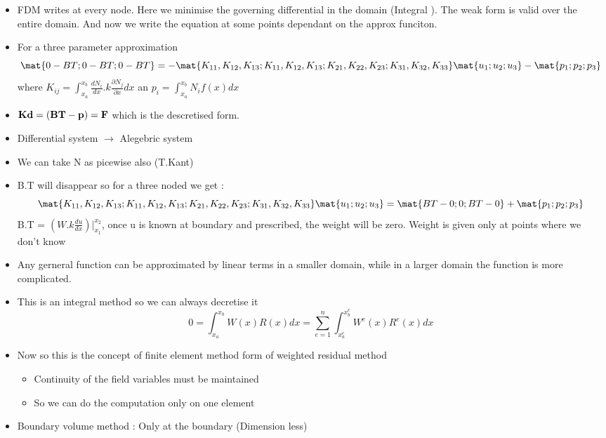 	\begin{frame}
		\begin{itemize}
			\item FDM writes at every node. Here we minimise the governing differential in the domain (Integral ). The weak form is valid over the entire domain. And now we write the equation at some points dependant on the approx funciton.
			\item For a three parameter approximation
			\begin{equation}
			\mat{0-BT;0-BT;0-BT} = -\mat{K_{11},K_{12},K_{13}; K_{11},K_{12},K_{13};K_{21},K_{22},K_{23}; K_{31},K_{32},K_{33} }\mat{u_1;u_2;u_3} - \mat{p_1;p_2;p_3}
			\end{equation}
			where $K_{ij} = \int_{x_a}^{x_b} \frac{dN_i}{dx}.k \frac{\partial N_j }{\partial x} dx$ an $p_i = \int_{x_a}^{x_b} N_if(x)dx$
			\item $\mathbf{Kd = (BT-p) = F}$ which is the descretised form. 
			\item Differential system $\rightarrow$ Alegebric system
			\item We can take N as picewise also (T.Kant)
			\item B.T will disappear so for a three noded we get :
				\begin{equation}
			\mat{K_{11},K_{12},K_{13}; K_{11},K_{12},K_{13};K_{21},K_{22},K_{23}; K_{31},K_{32},K_{33} }\mat{u_1;u_2;u_3} =\mat{BT-0;0;BT-0} + \mat{p_1;p_2;p_3} 
			\end{equation}	
			B.T = $(W.k\frac{d u}{dx})|^{x_2}_{x_1}$, once u is known at boundary and prescribed, the weight will be zero. Weight is given only at points where we don't know
	\end{itemize}
	\end{frame}



	\begin{frame}
		\begin{itemize}
			\item Any  gerneral function can be approximated by linear terms in a smaller domain, while in a larger domain the function is more complicated.
			\item This is an integral method so we can always decretise it
			\begin{equation}
			0=\int_{x_a}^{x_b} W(x)R(x)dx = \sum_{e=1}^{n} \int_{x_a^e}^{x_b^e} W^e(x)R^e(x)dx
			\end{equation}
			\item Now so this is the concept of finite element method form of weighted residual method
			\begin{itemize}
				\item Continuity of the field variables must be maintained
				\item So we can do the computation only on one element
				
			\end{itemize}
			\item Boundary volume method : Only at the boundary (Dimension less)
		\end{itemize}
	\end{frame}



